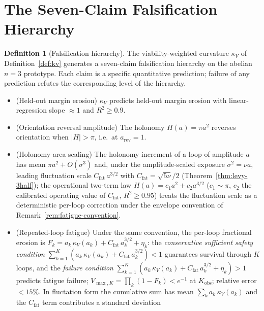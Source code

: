\documentclass[11pt,a4paper]{article}
\theoremstyle{plain}
\theoremstyle{definition}
\newtheorem{definition}[theorem]{Definition}
\theoremstyle{remark}
\newcommand{\kk}{\kappa_{\!V}}
\begin{document}

\section{The Seven-Claim Falsification Hierarchy}\label{sec:hierarchy}

\begin{definition}[Falsification hierarchy]
\label{def:hierarchy}
The viability-weighted curvature $\kk$ of
Definition~\ref{def:kv} generates
a seven-claim falsification
hierarchy on the abelian $n=3$ prototype. Each claim is a
specific quantitative prediction; failure of any prediction refutes
the corresponding level of the hierarchy.
\begin{itemize}[leftmargin=1.2em,itemsep=2pt]
\item[\textbf{A.}] (Held-out margin erosion) $\kk$ predicts held-out
margin erosion with linear-regression slope $\approx 1$ and $R^2\geq 0.9$.
\item[\textbf{B.}] (Orientation reversal amplitude) The holonomy
$H(a)=\pi a^2$ reverses orientation when $|H|>\pi$, i.e.\ at
$a_{\mathrm{rev}}=1$.
\item[\textbf{C.}] (Holonomy-area scaling) The holonomy increment
of a loop of amplitude $a$ has mean $\pi a^{2}+O(\sigma^{3})$ and,
under the amplitude-scaled exposure $\sigma^{2}=\nu a$, leading
fluctuation scale $C_{\mathrm{fat}}\,a^{3/2}$ with
$C_{\mathrm{fat}}=\sqrt{5\nu}/2$
(Theorem~\ref{thm:levy-3half}); the operational two-term law
$H(a)=c_1a^{2}+c_2a^{3/2}$ ($c_1\sim\pi$, $c_2$ the calibrated
operating value of $C_{\mathrm{fat}}$, $R^{2}\geq 0.95$) treats the
fluctuation scale as a deterministic per-loop correction under the
envelope convention of Remark~\ref{rem:fatigue-convention}.
\item[\textbf{D.}] (Repeated-loop fatigue) Under the same
convention, the per-loop fractional erosion is
$F_k = a_k\,\kk(a_k) + C_{\mathrm{fat}}\,a_k^{3/2} + \eta_k$:
the \emph{conservative sufficient safety condition}
$\sum_{k=1}^{K}(a_k\,\kk(a_k) + C_{\mathrm{fat}}\,a_k^{3/2}) < 1$
guarantees survival through $K$ loops, and the \emph{failure
condition}
$\sum_{k=1}^{K}(a_k\,\kk(a_k) + C_{\mathrm{fat}}\,a_k^{3/2} + \eta_k) > 1$
predicts fatigue failure; $V_{\max,K}=\prod_k(1-F_k)<e^{-1}$ at
$K_{\mathrm{obs}}$; relative error $<15\%$. In fluctation form the
cumulative sum has mean $\sum_k a_k\,\kk(a_k)$ and the
$C_{\mathrm{fat}}$ term contributes a standard deviation

\end{itemize}
\end{definition}
\end{document}
